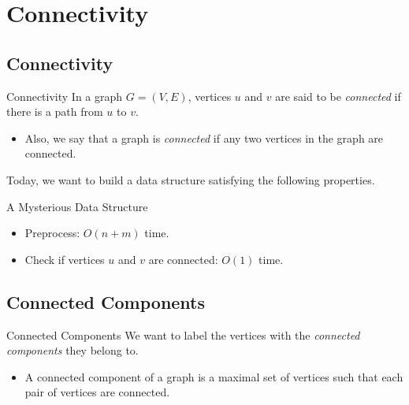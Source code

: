 \documentclass{beamer}
\begin{document}
\section{Connectivity}
\subsection{Connectivity}
\begin{frame}{Connectivity}
  In a graph $G = (V, E)$, vertices $u$ and $v$ are said to be \emph{connected}
  if there is a path from $u$ to $v$. \pause
  \begin{itemize}
    \item Also, we say that a graph is \emph{connected} if any two vertices in
    the graph are connected. \pause
  \end{itemize}
  \vspace{1em}
  Today, we want to build a data structure satisfying the following properties.
  \pause
  \begin{block}{A Mysterious Data Structure}
    \pause
    \begin{itemize}
      \item Preprocess: $O(n + m)$ time. \pause
      \item Check if vertices $u$ and $v$ are {\color{red} connected}:
      $O(1)$ time.
    \end{itemize}
  \end{block}
\end{frame}

\subsection{Connected Components}
\begin{frame}{Connected Components}
  We want to label the vertices with the \emph{connected components} they
  belong to. \pause
  \begin{itemize}
    \item A connected component of a graph is a maximal set of vertices such
    that each pair of vertices are connected.
  \end{itemize}
  \vspace{1em}
  \pause
  \begin{figure}
  \end{figure}
\end{frame}
\end{document}
